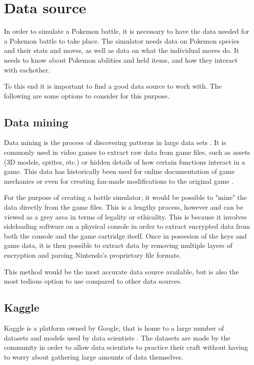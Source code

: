 \section{Data source}
\label{sec:data-source}

In order to simulate a Pokemon battle, it is necessary to have the data needed for a Pokemon battle to take place.
The simulator needs data on Pokemon species and their stats and moves, as well as data on what the individual moves do.
It needs to know about Pokemon abilities and held items, and how they interact with eachother.

To this end it is important to find a good data source to work with. The following are some options to consider
for this purpose.

\subsection{Data mining}
Data mining is the process of discovering patterns in large data sets \cite{DataMining}. It is commonly used in video games to extract raw data 
from game files, such as assets (3D models, sprites, etc.) or hidden details of how certain functions interact in a game. This data has historically
been used for online documentation of game mechanics \cite{DataMiningPokemon} or even for creating fan-made modifications to the original game \cite{RenegadePlatinum}.

For the purpose of creating a battle simulator, it would be possible to "mine" the data directly from the game files. This is a lengthy process, however
and can be viewed as a grey area in terms of legality or ethicality. This is because it involves sideloading software on a physical console in order to
extract encrypted data from both the console and the game cartridge itself. Once in possesion of the keys and game data, it is then possible to extract
data by removing multiple layers of encryption and parsing Nintendo's proprietary file formats.

This method would be the most accurate data source available, but is also the most tedious option to use compared to other data sources.

\subsection{Kaggle}
Kaggle is a platform owned by Google, that is home to a large number of datasets and models used by data scientists \cite{WhatIsKaggle}.
The datasets are made by the community in order to allow data scientists to practice their craft without having to worry about gathering large amounts of
data themselves. 


